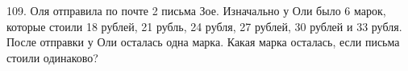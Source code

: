 109. Оля отправила по почте 2 письма Зое. Изначально у Оли было 6 марок, которые стоили 18 рублей, 21 рубль, 24 рубля, 27 рублей, 30 рублей и 33 рубля. После отправки у Оли осталась одна марка. Какая марка осталась, если письма стоили одинаково?\\

